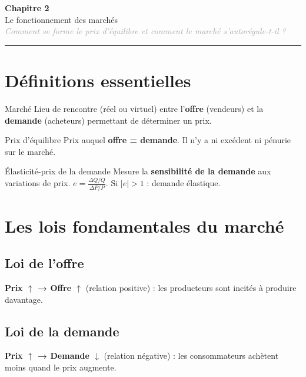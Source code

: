 \documentclass[11pt,a4paper]{article}
\begin{document}
\begin{center}
  {\Large\bfseries\textcolor{mainColor}{Chapitre 2}}\\[2pt]
  {\large Le fonctionnement des marchés}\\[4pt]
  \textit{\textcolor{darkGray}{Comment se forme le prix d'équilibre et comment le marché s'autorégule-t-il ?}}
\end{center}
\vspace{4pt}\hrule\vspace{8pt}

\section*{Définitions essentielles}

\begin{defbox}{Marché}
Lieu de rencontre (réel ou virtuel) entre l'\textbf{offre} (vendeurs) et la \textbf{demande} (acheteurs) permettant de déterminer un prix.
\end{defbox}

\vspace{4pt}
\begin{defbox}{Prix d'équilibre}
Prix auquel \textbf{offre = demande}. Il n'y a ni excédent ni pénurie sur le marché.
\end{defbox}

\vspace{4pt}
\begin{defbox}{Élasticité-prix de la demande}
Mesure la \textbf{sensibilité de la demande} aux variations de prix.
$e = \frac{\Delta Q / Q}{\Delta P / P}$. Si $|e| > 1$ : demande élastique.
\end{defbox}

\section*{Les lois fondamentales du marché}

\subsection*{Loi de l'offre}
\begin{keybox}
\textbf{Prix $\uparrow$ → Offre $\uparrow$} (relation positive) : les producteurs sont incités à produire davantage.
\end{keybox}

\subsection*{Loi de la demande}
\begin{keybox}
\textbf{Prix $\uparrow$ → Demande $\downarrow$} (relation négative) : les consommateurs achètent moins quand le prix augmente.
\end{keybox}
\end{document}
